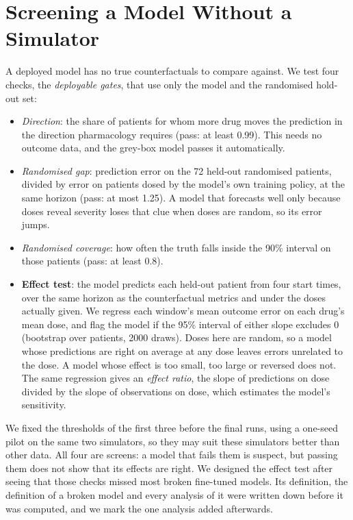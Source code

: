 \documentclass[letterpaper]{article}
\begin{document}
\section{Screening a Model Without a Simulator}

A deployed model has no true counterfactuals to compare against. We test four checks, the \emph{deployable gates}, that use only the model and the randomised hold-out set:
\begin{itemize}
\item \emph{Direction}: the share of patients for whom more drug moves the prediction in the direction pharmacology requires (pass: at least 0.99). This needs no outcome data, and the grey-box model passes it automatically.
\item \emph{Randomised gap}: prediction error on the 72 held-out randomised patients, divided by error on patients dosed by the model's own training policy, at the same horizon (pass: at most 1.25). A model that forecasts well only because doses reveal severity loses that clue when doses are random, so its error jumps.
\item \emph{Randomised coverage}: how often the truth falls inside the 90\% interval on those patients (pass: at least 0.8).
\item \textbf{Effect test}: the model predicts each held-out patient from four start times, over the same horizon as the counterfactual metrics and under the doses actually given. We regress each window's mean outcome error on each drug's mean dose, and flag the model if the 95\% interval of either slope excludes 0 (bootstrap over patients, 2000 draws). Doses here are random, so a model whose predictions are right on average at any dose leaves errors unrelated to the dose. A model whose effect is too small, too large or reversed does not. The same regression gives an \emph{effect ratio}, the slope of predictions on dose divided by the slope of observations on dose, which estimates the model's sensitivity.
\end{itemize}
We fixed the thresholds of the first three before the final runs, using a one-seed pilot on the same two simulators, so they may suit these simulators better than other data. All four are screens: a model that fails them is suspect, but passing them does not show that its effects are right. We designed the effect test after seeing that those checks missed most broken fine-tuned models. Its definition, the definition of a broken model and every analysis of it were written down before it was computed, and we mark the one analysis added afterwards.
\end{document}
